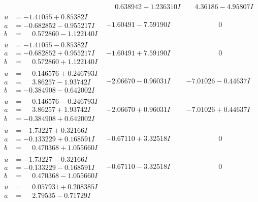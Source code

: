 \documentclass[1p]{elsarticle_modified}
\theoremstyle{definition}
\begin{document}
$$\begin{array}{c|c|c}
 & \phantom{-}0.638942 + 1.236310 I & \phantom{-}4.36186 - 4.95807 I \\ \hline\begin{aligned}
u &= -1.41055 + 0.85382 I \\
a &= -0.682852 - 0.955217 I \\
b &= \phantom{-}0.572860 - 1.122140 I\end{aligned}
 & -1.60491 - 7.59190 I & \phantom{-0.000000 } 0 \\ \hline\begin{aligned}
u &= -1.41055 - 0.85382 I \\
a &= -0.682852 + 0.955217 I \\
b &= \phantom{-}0.572860 + 1.122140 I\end{aligned}
 & -1.60491 + 7.59190 I & \phantom{-0.000000 } 0 \\ \hline\begin{aligned}
u &= \phantom{-}0.146576 + 0.246793 I \\
a &= \phantom{-}3.86257 - 1.93742 I \\
b &= -0.384908 - 0.642002 I\end{aligned}
 & -2.06670 - 0.96031 I & -7.01026 - 0.44637 I \\ \hline\begin{aligned}
u &= \phantom{-}0.146576 - 0.246793 I \\
a &= \phantom{-}3.86257 + 1.93742 I \\
b &= -0.384908 + 0.642002 I\end{aligned}
 & -2.06670 + 0.96031 I & -7.01026 + 0.44637 I \\ \hline\begin{aligned}
u &= -1.73227 + 0.32166 I \\
a &= -0.133229 + 0.168591 I \\
b &= \phantom{-}0.470368 + 1.055660 I\end{aligned}
 & -0.67110 + 3.32518 I & \phantom{-0.000000 } 0 \\ \hline\begin{aligned}
u &= -1.73227 - 0.32166 I \\
a &= -0.133229 - 0.168591 I \\
b &= \phantom{-}0.470368 - 1.055660 I\end{aligned}
 & -0.67110 - 3.32518 I & \phantom{-0.000000 } 0 \\ \hline\begin{aligned}
u &= \phantom{-}0.057931 + 0.208385 I \\
a &= \phantom{-}2.79535 - 0.71729 I \\

\end{aligned}
\end{array}$$
\end{document}
